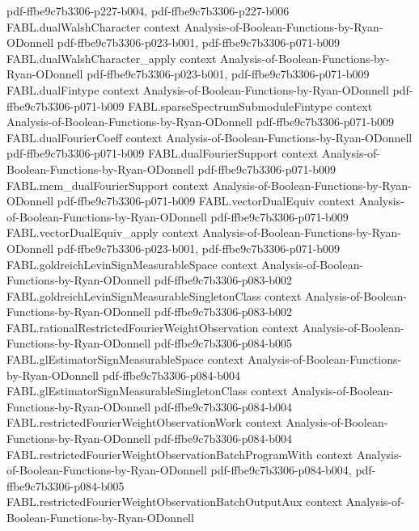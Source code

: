 \begin{theorem}
  {pdf-ffbe9c7b3306-p227-b004,
    pdf-ffbe9c7b3306-p227-b006}
\proofstep
  {FABL.dualWalshCharacter}
  {context}
  {Analysis-of-Boolean-Functions-by-Ryan-ODonnell}
  {pdf-ffbe9c7b3306-p023-b001,
    pdf-ffbe9c7b3306-p071-b009}
\proofstep
  {FABL.dualWalshCharacter_apply}
  {context}
  {Analysis-of-Boolean-Functions-by-Ryan-ODonnell}
  {pdf-ffbe9c7b3306-p023-b001,
    pdf-ffbe9c7b3306-p071-b009}
\proofstep
  {FABL.dualFintype}
  {context}
  {Analysis-of-Boolean-Functions-by-Ryan-ODonnell}
  {pdf-ffbe9c7b3306-p071-b009}
\proofstep
  {FABL.sparseSpectrumSubmoduleFintype}
  {context}
  {Analysis-of-Boolean-Functions-by-Ryan-ODonnell}
  {pdf-ffbe9c7b3306-p071-b009}
\proofstep
  {FABL.dualFourierCoeff}
  {context}
  {Analysis-of-Boolean-Functions-by-Ryan-ODonnell}
  {pdf-ffbe9c7b3306-p071-b009}
\proofstep
  {FABL.dualFourierSupport}
  {context}
  {Analysis-of-Boolean-Functions-by-Ryan-ODonnell}
  {pdf-ffbe9c7b3306-p071-b009}
\proofstep
  {FABL.mem_dualFourierSupport}
  {context}
  {Analysis-of-Boolean-Functions-by-Ryan-ODonnell}
  {pdf-ffbe9c7b3306-p071-b009}
\proofstep
  {FABL.vectorDualEquiv}
  {context}
  {Analysis-of-Boolean-Functions-by-Ryan-ODonnell}
  {pdf-ffbe9c7b3306-p071-b009}
\proofstep
  {FABL.vectorDualEquiv_apply}
  {context}
  {Analysis-of-Boolean-Functions-by-Ryan-ODonnell}
  {pdf-ffbe9c7b3306-p023-b001,
    pdf-ffbe9c7b3306-p071-b009}
\proofstep
  {FABL.goldreichLevinSignMeasurableSpace}
  {context}
  {Analysis-of-Boolean-Functions-by-Ryan-ODonnell}
  {pdf-ffbe9c7b3306-p083-b002}
\proofstep
  {FABL.goldreichLevinSignMeasurableSingletonClass}
  {context}
  {Analysis-of-Boolean-Functions-by-Ryan-ODonnell}
  {pdf-ffbe9c7b3306-p083-b002}
\proofstep
  {FABL.rationalRestrictedFourierWeightObservation}
  {context}
  {Analysis-of-Boolean-Functions-by-Ryan-ODonnell}
  {pdf-ffbe9c7b3306-p084-b005}
\proofstep
  {FABL.glEstimatorSignMeasurableSpace}
  {context}
  {Analysis-of-Boolean-Functions-by-Ryan-ODonnell}
  {pdf-ffbe9c7b3306-p084-b004}
\proofstep
  {FABL.glEstimatorSignMeasurableSingletonClass}
  {context}
  {Analysis-of-Boolean-Functions-by-Ryan-ODonnell}
  {pdf-ffbe9c7b3306-p084-b004}
\proofstep
  {FABL.restrictedFourierWeightObservationWork}
  {context}
  {Analysis-of-Boolean-Functions-by-Ryan-ODonnell}
  {pdf-ffbe9c7b3306-p084-b004}
\proofstep
  {FABL.restrictedFourierWeightObservationBatchProgramWith}
  {context}
  {Analysis-of-Boolean-Functions-by-Ryan-ODonnell}
  {pdf-ffbe9c7b3306-p084-b004,
    pdf-ffbe9c7b3306-p084-b005}
\proofstep
  {FABL.restrictedFourierWeightObservationBatchOutputAux}
  {context}
  {Analysis-of-Boolean-Functions-by-Ryan-ODonnell}

\end{theorem}
